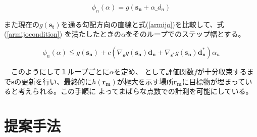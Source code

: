 \documentclass[12pt,a4paper]{jsreport}
\begin{document}
  \begin{equation}
    \phi_{n}(\alpha) 
    = g(\bm{s_{n}}+\alpha\bm_{d_{n}})
        \label{armijo}
    \end{equation}   
  
  また現在の$g(\bm{s_{t}})$を通る勾配方向の直線と式(\ref{armijo})を比較して、式(\ref{armijocondition})
  を満たしたときの$\alpha$をそのループでのステップ幅とする。

  \begin{equation}
    \phi_{n}(\alpha) \leqq g(\bm{s_{n}})+c(\nabla_{\bm{s}}g(\bm{s_{n}})\bm{d_{n}}+\nabla_{\bm{s^{*}}}g(\bm{s_{n}})\bm{d^{*}_{n}})\alpha_{n}
        \label{armijocondition}
    \end{equation}

  　このようにして１ループごとに$\alpha$を定め、  
  として評価関数$f$が十分収束するまで$\bm{s}$の更新を行い、最終的に$h(\bm{r_{m}})$が極大を示す場所$\bm{r_{m}}$に目標物が埋まっていると考えられる。この手順に
  よってまばらな点数での計測を可能にしている。
          

\chapter{提案手法}
\end{document}
